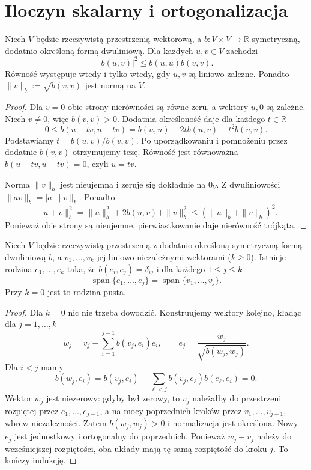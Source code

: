 \section{Iloczyn skalarny i ortogonalizacja}
\label{sec:lin9-skalarne}

\begin{twierdzenie}
\label{thm:lin9-cauchy-schwarz}
Niech \(V\) będzie rzeczywistą
przestrzenią wektorową,
a \(b\colon V\times V\to\mathbb R\)
symetryczną, dodatnio określoną
formą dwuliniową.
Dla każdych \(u,v\in V\) zachodzi
\[
 |b(u,v)|^2\le b(u,u)b(v,v).
\]
Równość występuje wtedy i tylko wtedy,
gdy \(u,v\) są liniowo zależne.
Ponadto
\(\|v\|_b:=\sqrt{b(v,v)}\)
jest normą na \(V\).
\end{twierdzenie}
\begin{proof}
Dla \(v=0\) obie strony
nierówności są równe zeru,
a wektory \(u,0\) są zależne.
Niech \(v\ne0\), więc \(b(v,v)>0\).
Dodatnia określoność daje dla każdego
\(t\in\mathbb R\)
\[
 0\le b(u-tv,u-tv)
 =b(u,u)-2tb(u,v)+t^2b(v,v).
\]
Podstawiamy
\(t=b(u,v)/b(v,v)\).
Po uporządkowaniu i pomnożeniu
przez dodatnie \(b(v,v)\)
otrzymujemy tezę.
Równość jest równoważna
\(b(u-tv,u-tv)=0\),
czyli \(u=tv\).

Norma \(\|v\|_b\) jest nieujemna
i zeruje się dokładnie na \(0_V\).
Z dwuliniowości
\(\|av\|_b=|a|\|v\|_b\).
Ponadto
\[
 \|u+v\|_b^2
 =\|u\|_b^2+2b(u,v)+\|v\|_b^2
 \le(\|u\|_b+\|v\|_b)^2.
\]
Ponieważ obie strony są nieujemne,
pierwiastkowanie daje
nierówność trójkąta.
\end{proof}

\begin{twierdzenie}
\label{thm:lin9-gram-schmidt}
Niech \(V\) będzie rzeczywistą
przestrzenią z dodatnio określoną
symetryczną formą dwuliniową \(b\),
a \(v_1,\ldots,v_k\) jej
liniowo niezależnymi wektorami
(\(k\ge0\)).
Istnieje rodzina \(e_1,\ldots,e_k\)
taka, że
\(b(e_i,e_j)=\delta_{ij}\)
i dla każdego \(1\le j\le k\)
\[
 \operatorname{span}\{e_1,\ldots,e_j\}
 =\operatorname{span}\{v_1,\ldots,v_j\}.
\]
Przy \(k=0\) jest to rodzina pusta.
\end{twierdzenie}
\begin{proof}
Dla \(k=0\) nic nie trzeba dowodzić.
Konstruujemy wektory kolejno,
kładąc dla \(j=1,\ldots,k\)
\[
 w_j=v_j-\sum_{i=1}^{j-1}
                      b(v_j,e_i)e_i,
 \qquad
 e_j=\frac{w_j}{\sqrt{b(w_j,w_j)}}.
\]
Dla \(i<j\) mamy
\[
 b(w_j,e_i)
 =b(v_j,e_i)
  -\sum_{\ell<j}b(v_j,e_\ell)
                        b(e_\ell,e_i)=0.
\]
Wektor \(w_j\) jest niezerowy:
gdyby był zerowy, to \(v_j\)
należałby do przestrzeni
rozpiętej przez \(e_1,\ldots,e_{j-1}\),
a na mocy poprzednich kroków
przez \(v_1,\ldots,v_{j-1}\),
wbrew niezależności.
Zatem \(b(w_j,w_j)>0\)
i normalizacja jest określona.
Nowy \(e_j\) jest jednostkowy
i ortogonalny do poprzednich.
Ponieważ \(w_j-v_j\) należy
do wcześniejszej rozpiętości,
oba układy mają tę samą
rozpiętość do kroku \(j\).
To kończy indukcję.
\end{proof}

